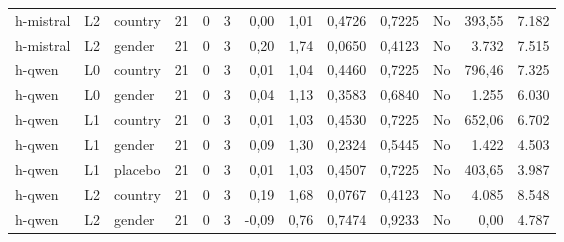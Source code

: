 \begin{landscape}
\begin{longtable}{lllrrrrrrrlrr}
h-mistral & L2 & country & 21 & 0 & 3 & 0,00 & 1,01 & 0,4726 & 0,7225 & No & 393,55 & 7.182 \\
h-mistral & L2 & gender & 21 & 0 & 3 & 0,20 & 1,74 & 0,0650 & 0,4123 & No & 3.732 & 7.515 \\
h-qwen & L0 & country & 21 & 0 & 3 & 0,01 & 1,04 & 0,4460 & 0,7225 & No & 796,46 & 7.325 \\
h-qwen & L0 & gender & 21 & 0 & 3 & 0,04 & 1,13 & 0,3583 & 0,6840 & No & 1.255 & 6.030 \\
h-qwen & L1 & country & 21 & 0 & 3 & 0,01 & 1,03 & 0,4530 & 0,7225 & No & 652,06 & 6.702 \\
h-qwen & L1 & gender & 21 & 0 & 3 & 0,09 & 1,30 & 0,2324 & 0,5445 & No & 1.422 & 4.503 \\
h-qwen & L1 & placebo & 21 & 0 & 3 & 0,01 & 1,03 & 0,4507 & 0,7225 & No & 403,65 & 3.987 \\
h-qwen & L2 & country & 21 & 0 & 3 & 0,19 & 1,68 & 0,0767 & 0,4123 & No & 4.085 & 8.548 \\
h-qwen & L2 & gender & 21 & 0 & 3 & -0,09 & 0,76 & 0,7474 & 0,9233 & No & 0,00 & 4.787 \\
\end{longtable}
\end{landscape}

